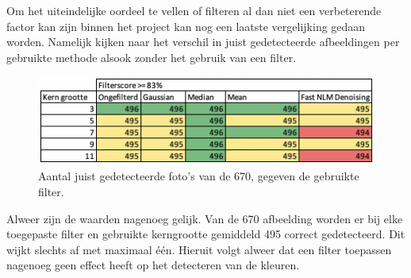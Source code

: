 Om het uiteindelijke oordeel te vellen of filteren al dan niet een verbeterende factor kan zijn binnen het project kan nog een laatste vergelijking gedaan worden. Namelijk kijken naar het verschil in juist gedetecteerde afbeeldingen per gebruikte methode alsook zonder het gebruik van een filter.

\begin{figure}[h!]
  \includegraphics[width=\linewidth]{img/filternofilter}
  \caption{Aantal juist gedetecteerde foto's van de 670, gegeven de gebruikte filter.}
  \label{fig:filternofilter}
\end{figure}

Alweer zijn de waarden nagenoeg gelijk. Van de 670 afbeelding worden er bij elke toegepaste filter en gebruikte kerngrootte gemiddeld 495 correct gedetecteerd. Dit wijkt slechts af met maximaal één. Hieruit volgt alweer dat een filter toepassen nagenoeg geen effect heeft op het detecteren van de kleuren. 